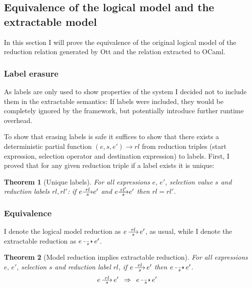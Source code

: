 \documentclass[12pt,twoside,notitlepage]{report}
\newcommand{\red}[2]{\stackon[.05ex]{\stackunder[-0.05ex]{$\longrightarrow$}{$\scriptstyle #1$}}{$\scriptstyle #2$}}
\newcommand{\xred}[1]{\stackunder[-0.05ex]{$\dashrightarrow$}{$\scriptstyle #1$}}
\theoremstyle{plain}%
\newtheorem{thm}{Theorem}[section]
\theoremstyle{definition}
\theoremstyle{remark}
\begin{document}
\subsection{Equivalence of the logical model and the extractable model}
In this section I will prove the equivalence of the original logical model of the reduction relation generated by Ott and the relation extracted to OCaml.
\subsubsection{Label erasure}
As labels are only used to show properties of the system I decided not to include them in the extractable semantics: If labels were included, they would be completely ignored by the framework, but potentially introduce further runtime overhead.

To show that erasing labels is safe it suffices to show that there exists a deterministic partial function $ (e,s,e') \rightarrow rl $ from reduction triples (start expression, selection operator and destination expression) to labels. First, I proved that for any given reduction triple if a label exists it is unique:
\begin{thm}[Unique labels]
\label{thm:unique_label}
For all expressions $ e,\, e'$, selection value $ s $ and reduction labels $ rl, rl' $:
 if $ e \red{s}{rl}e' $ and $ e \red{s}{rl'}e' $ then $ rl = rl' $. 
\end{thm}
\subsubsection{Equivalence}
I denote the logical model reduction as $ e\, \red{s}{rl}\, e' $, as usual, while I denote the extractable reduction as $ e\, \xred{s}\, e' $.

\begin{thm}[Model reduction implies extractable reduction]
\label{thm:jo_to_xjo}
For all expressions $ e,\,e' $, selection $ s $ and reduction label $ rl $, if $ e\, \red{s}{rl}\, e' $ then $  e\, \xred{s}\, e' $.
\[  e\, \red{s}{rl}\, e' \,\,\,\Rightarrow \,\,\, e\, \xred{s}\, e' \]
\end{thm}
\end{document}
